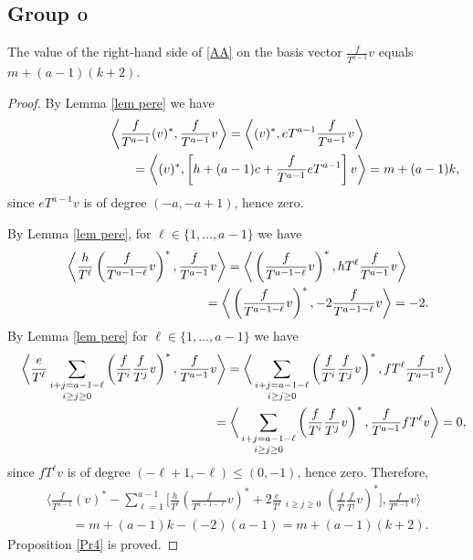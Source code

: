 \subsection[Group ${\rm O}$]{Group $\boldsymbol{{\rm O}}$}\label{subsec group O}
\begin{prop}\label{Pr4}The value of the right-hand side of \eqref{AA} on the basis vector $\frac{f}{T^{a-1}}v$ equals $m + (a-1)(k+2)$.
\end{prop}
\begin{proof}By Lemma \ref{lem pere} we have{\samepage
\begin{gather*}
\left\langle \frac{f}{T^{a-1}} (v)^*, \frac{f}{T^{a-1}} v \right\rangle = \left\langle (v)^*, eT^{a-1} \frac{f}{T^{a-1}} v \right\rangle \\
\hphantom{\left\langle \frac{f}{T^{a-1}} (v)^*, \frac{f}{T^{a-1}} v \right\rangle} = \left\langle (v)^*, \left[ h+(a-1)c + \frac{f}{T^{a-1}} eT^{a-1} \right] v \right\rangle = m + (a-1)k,
\end{gather*}
since $eT^{a-1} v$ is of degree $(-a, -a+1)$, hence zero.}

By Lemma \ref{lem pere}, for $ \ell \in \{ 1, \dots, a-1 \}$ we have
\begin{gather*}
 \bigg\langle \frac{h}{T^{\ell}} \left( \frac{f}{T^{a-1-\ell}} v \right)^*, \frac{f}{T^{a-1}} v \bigg\rangle
 = \bigg\langle \left( \frac{f}{T^{a-1-\ell}} v \right)^*, hT^{\ell} \frac{f}{T^{a-1}} v \bigg\rangle \\
 \hphantom{\bigg\langle \frac{h}{T^{\ell}} \left( \frac{f}{T^{a-1-\ell}} v \right)^*, \frac{f}{T^{a-1}} v \bigg\rangle}{} = \bigg\langle \left( \frac{f}{T^{a-1-\ell}} v \right)^*, -2 \frac{f}{T^{a-1-\ell}} v \bigg\rangle = -2.
\end{gather*}
By Lemma \ref{lem pere} for $ \ell \in \{ 1, \dots, a-1 \}$ we have
\begin{gather*}
\bigg\langle \frac{e}{T^{\ell}} \mathop{\sum_{i+j=a-1-\ell}}_{i\geq j\geq 0} \left(\frac{f}{T^i} \frac{f}{T^j}v \right)^*, \frac{f}{T^{a-1}} v \bigg\rangle = \bigg\langle \mathop{\sum_{i+j=a-1-\ell}}_{i\geq j\geq 0} \left(\frac{f}{T^i} \frac{f}{T^j}v \right)^*, fT^{\ell} \frac{f}{T^{a-1}} v \bigg\rangle \\
\hphantom{\bigg\langle \frac{e}{T^{\ell}} \mathop{\sum_{i+j=a-1-\ell}}_{i\geq j\geq 0} \left(\frac{f}{T^i} \frac{f}{T^j}v \right)^*, \frac{f}{T^{a-1}} v \bigg\rangle} = \bigg\langle \mathop{\sum_{i+j=a-1-\ell}}_{i\geq j\geq 0} \left(\frac{f}{T^i} \frac{f}{T^j}v \right)^*, \frac{f}{T^{a-1}} fT^{\ell} v \bigg\rangle =0,
\end{gather*}
since $fT^{\ell} v$ is of degree $ (-\ell+1, -\ell) \leq (0,-1)$, hence zero. Therefore,
\begin{gather*}
\bigg\langle \frac{f}{T^{a-1}} (v)^* - \sum_{\ell=1}^{a-1} \bigg[\frac{h}{T^\ell}\left(\frac{f}{T^{a-1-\ell}}v\right)^* + 2\frac{e}{T^\ell} \mathop{\sum_{i+j=a-1-\ell}}_{i\geq j\geq 0} \left(\frac{f}{T^i}\frac{f}{T^j}v\right)^* \bigg], \frac{f}{T^{a-1}} v \bigg\rangle \\
\qquad{}= m + (a-1)k - (-2)(a-1) = m + (a-1)(k+2).
\end{gather*}
Proposition \ref{Pr4} is proved.
\end{proof}

